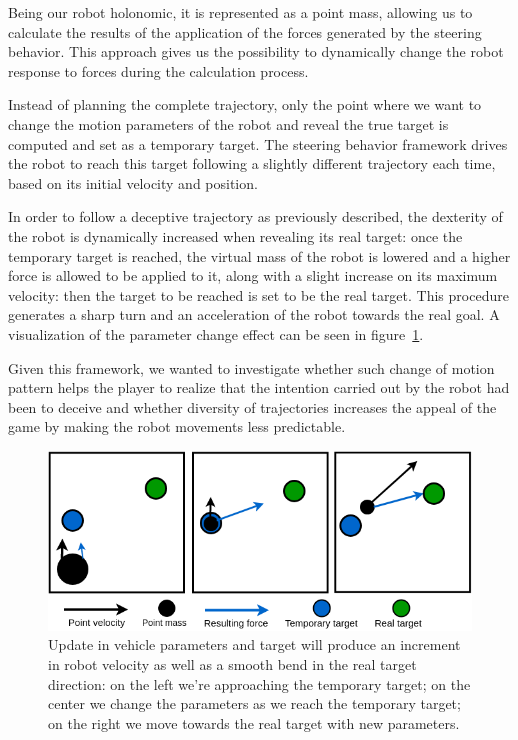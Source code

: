 Being our robot holonomic, it is represented as a point mass, allowing us to calculate the results of the application of the forces generated by the steering behavior. This approach gives us the possibility to dynamically change the robot response to forces during the calculation process.

Instead of planning the complete trajectory, only the point where we want to change the motion parameters of the robot and reveal the true target is computed and set as a temporary target. The steering behavior framework drives the robot to reach this target following a slightly different trajectory each time, based on its initial velocity and position.

In order to follow a deceptive trajectory as previously described, the dexterity of the robot is dynamically increased when revealing its real target: once the temporary target is reached, the virtual mass of the robot is lowered and a higher force is allowed to be applied to it, along with a slight increase on its maximum velocity: then the target to be reached is set to be the real target. This procedure generates a sharp turn and an acceleration of the robot towards the real goal. A visualization of the parameter change effect can be seen in figure~\ref{fig::trajectorySteering}. 

Given this framework, we wanted to investigate whether such change of motion pattern helps the player to realize that the intention carried out by the robot had been to deceive and whether diversity of trajectories increases the appeal of the game by making the robot movements less predictable.

\begin{figure}[htbp]
    \centering
    \includegraphics[scale=0.33]{images/06-deception/parameterUpdate}
    \caption{Update in vehicle parameters and target will produce an increment in robot velocity as well as a smooth bend in the real target direction: on the left we're approaching the temporary target; on the center we change the parameters as we reach the temporary target; on the right we move towards the real target with new parameters.}
    \label{fig::trajectorySteering}
\end{figure}

